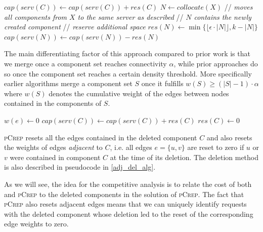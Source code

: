 \documentclass[a4paper,UKenglish,cleveref, autoref, thm-restate,authorcolumns]{lipics-v2019}
\newcommand{\adjDel}{\textsc{pCrep}}
\newcommand{\opt}{\text{O{\scriptsize PT}}}
\begin{document}
\begin{algorithm}[t]
	\caption{mergeAndRes($X$)}
	\label{mergeAndRes}
	\begin{algorithmic}
		\STATE $cap(serv(C))\gets cap(serv(C))+res(C)$		
		\ENDFOR
		\STATE $N\gets collocate(X)$  // \emph{moves all components from $X$ to the same server as described} 
		\STATE // \emph{$N$ contains the newly created component} 
		\STATE // \emph{reserve additional space} 
		\STATE $res(N)\gets\min\{\lfloor\epsilon\cdot|N|\rfloor,k-|N|\}$
		\STATE $cap(serv(N))\gets cap(serv(N))-res(N)$
		\ENDIF	
		
		
	\end{algorithmic}
\end{algorithm}

 The main differentiating factor of this approach compared
to prior work \cite{Avin2015,Avin2016} is that we merge once a 
component set reaches connectivity $\alpha$, while prior approaches do so once the component set reaches a certain density threshold. More specifically earlier algorithms
 merge a component set $S$ once it fulfills $w(S)\geq(|S|-1)\cdot\alpha$ where $w(S)$ denotes the cumulative weight of the edges between nodes contained in the components of $S$.

\begin{algorithm}
	\caption{delete($Y$) of \adjDel{}}
	\label{adj_del_alg}
	\begin{algorithmic}
		\FORALL{$e=\{u,v\}\in E$}
		\IF{$u\in Y$ or $v\in Y$}
		\STATE $w(e)\gets0$
		\ENDIF
		\ENDFOR
		\FORALL{$C\in Y$}
		\STATE $cap(serv(C))\gets cap(serv(C)) +res(C)$
		\STATE $res(C)\gets 0$			
		\ENDFOR
	\end{algorithmic}
\end{algorithm}

\adjDel{} resets all the edges contained in the deleted component $C$ and also resets the weights of edges \textit{adjacent} to $C$, i.e. all edges $e=\{u,v\}$ are reset to zero if $u$ or $v$ were contained in component $C$ at the time of its deletion. The deletion method is also described in pseudocode in \cref{adj_del_alg}.

As we will see, the idea for the competitive analysis is to relate the cost of both \opt{} and \adjDel{} to the deleted components in the solution of \adjDel{}.
The fact that \adjDel{} also resets adjacent edges means that we can uniquely identify requests with the deleted component whose deletion led to the reset of the corresponding edge weights to zero. 
\end{document}

